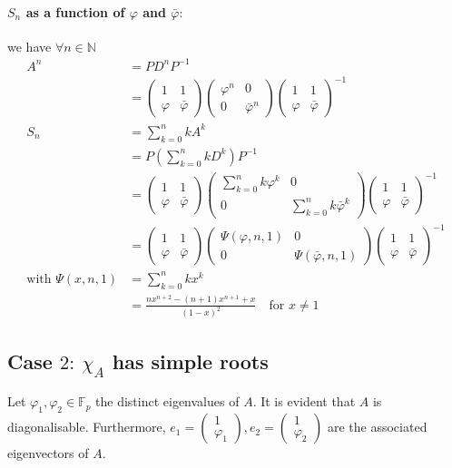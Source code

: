 \documentclass[]{article}
\begin{document}
\paragraph{$S_n$ as a function of $\varphi$ and $\bar\varphi:$}
we have $\forall n\in\mathbb{N}$
\begin{align*}
A^n&=PD^nP^{-1}\\
&=\begin{pmatrix}
	1 & 1 \\ \varphi & \bar\varphi 
\end{pmatrix} \begin{pmatrix}
	\varphi^n & 0 \\ 0 & \bar {\varphi}^n
\end{pmatrix}\begin{pmatrix}
	1 & 1 \\ \varphi & \bar\varphi
\end{pmatrix}^{-1} \\
S_n&= \sum_{k=0}^n k A^k \\
&= P\left(\sum_{k=0}^{n} kD^k\right)P^{-1}\\
&= \begin{pmatrix}
	1 & 1 \\ \varphi & \bar\varphi 
\end{pmatrix} \begin{pmatrix}
	\sum_{k=0}^nk\varphi^k& 0 \\ 0 & \sum_{k=0}^nk\bar {\varphi}^k
\end{pmatrix}\begin{pmatrix}
	1 & 1 \\ \varphi & \bar\varphi
\end{pmatrix}^{-1} \\ 
&= \begin{pmatrix}
	1 & 1 \\ \varphi & \bar\varphi 
\end{pmatrix} \begin{pmatrix}
	\Psi(\varphi,n,1)& 0 \\ 0 & \Psi(\bar {\varphi},n,1)
\end{pmatrix}\begin{pmatrix}
	1 & 1 \\ \varphi & \bar\varphi
\end{pmatrix}^{-1} \\
\text{with } \Psi(x,n,1)&= \sum_{k=0}^n k x^k \\
&=\frac{nx^{n+2}-(n+1)x^{n+1}+x}{(1-x)^2} \quad  \text{for } x\neq 1
\end{align*}
\subsection{Case $2: \ \chi_A$ has simple roots}
Let $\varphi_1,\varphi_2 \in\mathbb{F}_p$ the distinct eigenvalues of $A$.
It is evident that $A$ is diagonalisable.
\newline
Furthermore, $e_1=\begin{pmatrix}
	1 \\ \varphi_1
\end{pmatrix},e_2=\begin{pmatrix}
1 \\ \varphi_2
\end{pmatrix}$ are the associated eigenvectors of $A$.
\end{document}
